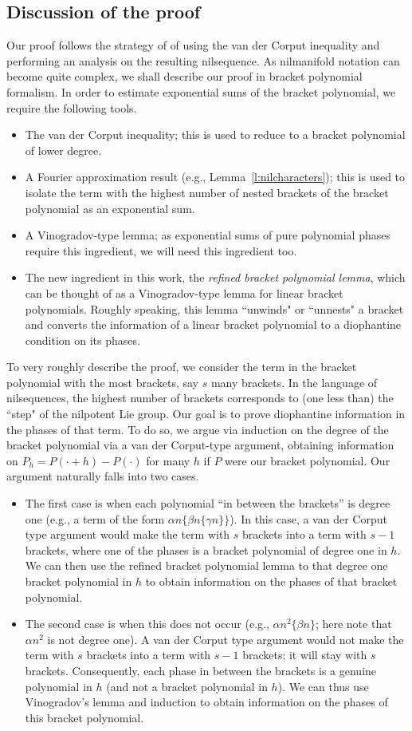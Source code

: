 \documentclass[11pt, a4paper]{amsart}
\theoremstyle{plain}
\theoremstyle{plain}
\theoremstyle{definition}
\theoremstyle{remark}
\numberwithin{equation}{section}
\numberwithin{lemma}{section}
\numberwithin{proposition}{section}
\numberwithin{corollary}{section}
\numberwithin{definition}{section}
\numberwithin{claim}{section}
\begin{document}
\subsection{Discussion of the proof}
Our proof follows the strategy of \cite{GT12} of using the van der Corput inequality and performing an analysis on the resulting nilsequence. As nilmanifold notation can become quite complex, we shall describe our proof in bracket polynomial formalism. In order to estimate exponential sums of the bracket polynomial, we require the following tools.
\begin{itemize}
    \item The van der Corput inequality; this is used to reduce to a bracket polynomial of lower degree.
    \item A Fourier approximation result (e.g., Lemma~\ref{l:nilcharacters}); this is used to isolate the term with the highest number of nested brackets of the bracket polynomial as an exponential sum.
    \item A Vinogradov-type lemma; as exponential sums of pure polynomial phases require this ingredient, we will need this ingredient too.
    \item The new ingredient in this work, the \emph{refined bracket polynomial lemma}, which can be thought of as a Vinogradov-type lemma for linear bracket polynomials. Roughly speaking, this lemma ``unwinds" or ``unnests" a bracket and converts the information of a linear bracket polynomial to a diophantine condition on its phases.
\end{itemize}
To very roughly describe the proof, we consider the term in the bracket polynomial with the most brackets, say $s$ many brackets. In the language of nilsequences, the highest number of brackets corresponds to (one less than) the ``step" of the nilpotent Lie group. Our goal is to prove diophantine information in the phases of that term. To do so, we argue via induction on the degree of the bracket polynomial via a van der Corput-type argument, obtaining information on $P_h = P(\cdot + h) - P(\cdot)$ for many $h$ if $P$ were our bracket polynomial. Our argument naturally falls into two cases.
\begin{itemize}
    \item The first case is when each polynomial ``in between the brackets'' is degree one (e.g., a term of the form $\alpha n\{\beta n\{\gamma n\}\}$). In this case, a van der Corput type argument would make the term with $s$ brackets into a term with $s - 1$ brackets, where one of the phases is a bracket polynomial of degree one in $h$. We can then use the refined bracket polynomial lemma to that degree one bracket polynomial in $h$ to obtain information on the phases of that bracket polynomial.
    \item The second case is when this does not occur (e.g., $\alpha n^2\{\beta n\}$; here note that $\alpha n^2$ is not degree one). A van der Corput type argument would not make the term with $s$ brackets into a term with $s - 1$ brackets; it will stay with $s$ brackets. Consequently, each phase in between the brackets is a genuine polynomial in $h$ (and not a bracket polynomial in $h$). We can thus use Vinogradov's lemma and induction to obtain information on the phases of this bracket polynomial.
\end{itemize}
\end{document}
